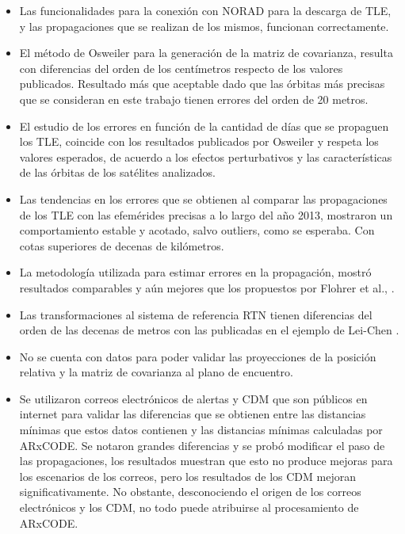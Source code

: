  \begin{itemize}
  \item Las funcionalidades para la conexi\'on con NORAD para la descarga de TLE, y las propagaciones que se realizan de los mismos, funcionan correctamente.\\
  \item El m\'etodo de Osweiler \citep{osweiler} para la generaci\'on de la matriz de covarianza, resulta con diferencias del orden de los cent\'imetros respecto de los valores publicados. Resultado m\'as que aceptable dado que las \'orbitas m\'as precisas que se consideran en este trabajo tienen errores del orden de 20 metros.\\
  \item El estudio de los errores en funci\'on de la cantidad de d\'ias que se propaguen los TLE, coincide con los resultados publicados por Osweiler \citep{osweiler} y respeta los valores esperados, de acuerdo a los efectos perturbativos y las caracter\'isticas de las \'orbitas de los sat\'elites analizados.\\
  \item Las tendencias en los errores que se obtienen al comparar las propagaciones de los TLE con las efem\'erides precisas a lo largo del a\~no 2013, mostraron un comportamiento estable y acotado, salvo outliers, como se esperaba. Con cotas superiores de decenas de kil\'ometros.\\
  \item La metodolog\'ia utilizada para estimar errores en la propagaci\'on, mostr\'o resultados comparables y a\'un mejores que los propuestos por Flohrer et al., \citep{flohrer2008assessment}.
  \item Las transformaciones al sistema de referencia RTN tienen diferencias del orden de las decenas de metros con las publicadas en el ejemplo de Lei-Chen \citep{leichen}.\\
  \item No se cuenta con datos para poder validar las proyecciones de la posici\'on relativa y la matriz de covarianza al plano de encuentro.\\
  \item Se utilizaron correos electr\'onicos de alertas y CDM que son p\'ublicos en internet para validar las diferencias que se obtienen entre las distancias m\'inimas que estos datos contienen y las distancias m\'inimas calculadas por ARxCODE. Se notaron grandes diferencias y se prob\'o modificar el paso de las propagaciones, los resultados muestran que esto no produce mejoras para los escenarios de los correos, pero los resultados de los CDM mejoran significativamente. No obstante, desconociendo el origen de los correos electr\'onicos y los CDM, no todo puede atribuirse al procesamiento de ARxCODE.\\

\end{itemize}
